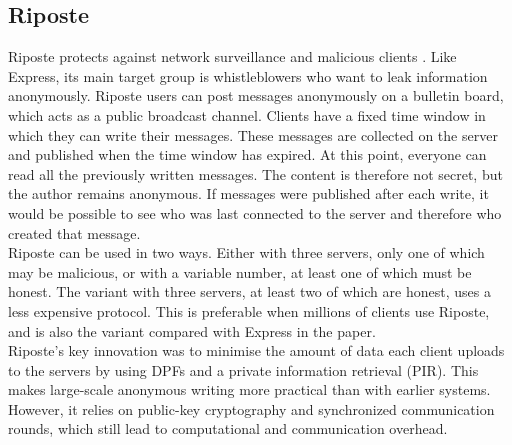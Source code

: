 \documentclass[a4paper]{article}
\begin{document}
\subsection{Riposte}
Riposte protects against network surveillance and malicious clients \citep{Corrigan_Gibbs_2015}. Like Express, its main target group is whistleblowers who want to leak information anonymously. Riposte users can post messages anonymously on a bulletin board, which acts as a public broadcast channel. Clients have a fixed time window in which they can write their messages. These messages are collected on the server and published when the time window has expired. At this point, everyone can read all the previously written messages. The content is therefore not secret, but the author remains anonymous. If messages were published after each write, it would be possible to see who was last connected to the server and therefore who created that message.\\
Riposte can be used in two ways. Either with three servers, only one of which may be malicious, or with a variable number, at least one of which must be honest. The variant with three servers, at least two of which are honest, uses a less expensive protocol. This is preferable when millions of clients use Riposte, and is also the variant compared with Express in the paper. \\
Riposte's key innovation was to minimise the amount of data each client uploads to the servers by using DPFs and a private information retrieval (PIR). This makes large-scale anonymous writing more practical than with earlier systems. However, it relies on public-key cryptography and synchronized communication rounds, which still lead to computational and communication overhead.
\end{document}
